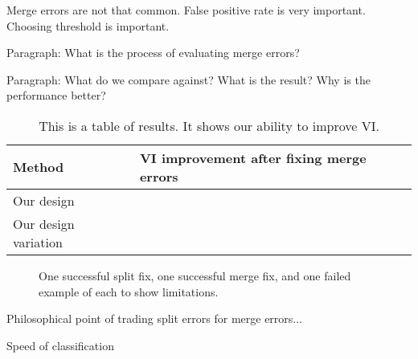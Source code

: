 Merge errors are not that common. False positive rate is very important. Choosing threshold is important.

Paragraph: What is the process of evaluating merge errors?

Paragraph: What do we compare against? What is the result? Why is the performance better?

\begin{table}[t]
\begin{tabular}{ll}
\toprule
Method & VI improvement after fixing merge errors \\
\midrule
Our design &  \\
Our design variation & \\
\bottomrule
\end{tabular}
\caption{This is a table of results. It shows our ability to improve VI.}
\end{table}

\begin{figure}[t]
\caption{One successful split fix, one successful merge fix, and one failed example of each to show limitations.}
\end{figure}

Philosophical point of trading split errors for merge errors...


Speed of classification